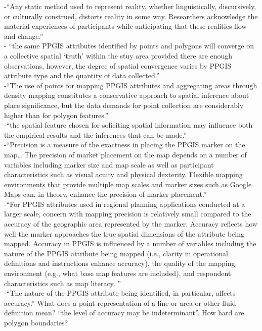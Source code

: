 -{\color{orange}“Any static method used to represent reality, whether linguistically, discursively, or culturally construed, distorts reality in some way. Researchers acknowledge the material experiences of participants while anticipating that these realities flow and change.”\cite{McQueenBaker2019}}\\
-{\color{orange} “the same PPGIS attributes identified by points and polygons will converge on a collective spatial ‘truth’ within the stuy area provided there are enough observations, however, the degree of spatial convergence varies by PPGIS attribute type and the quantity of data collected.”\cite{Brown2012}}\\
-{\color{orange}“The use of points for mapping PPGIS attributes and aggregating areas through density mapping constitutes a conservative approach to spatial inference about place significance, but the data demands for point collection are considerably higher than for polygon features.”\cite{Brown2012}}\\
-{\color{orange}“the spatial feature chosen for soliciting spatial information may influence both the empirical results and the inferences that can be made.”\cite{Brown2012}}\\
-{\color{orange}“Precision is a measure of the exactness in placing the PPGIS marker on the map… The precision of market placement on the map depends on a number of variables including marker size and map scale as well as participant characteristics such as visual acuity and physical dexterity. Flexible mapping environments that provide multiple map scales and marker sizes such as Google Maps can, in theory, enhance the precision of marker placement.” \cite{Brown2012}}\\
-{\color{orange}“For PPGIS attributes used in regional planning applications conducted at a larger scale, concern with mapping precision is relatively small compared to the accuracy of the geographic area represented by the marker. Accuracy reflects how well the marker approaches the true spatial dimensions of the attribute being mapped.  Accuracy in PPGIS is influenced by a number of variables including the nature of the PPGIS attribute being mapped (i.e., clarity in operational definitions and instructions enhance accuracy), the quality of the mapping environment (e.g., what base map features are included), and respondent characteristics such as map literacy. ”\cite{Brown2012}}\\
-{\color{orange}“The nature of the PPGIS attribute being identified, in particular, affects accuracy.” What does a point representation of a line or area or other fluid definition mean? “the level of accuracy may be indeterminant”. How hard are polygon boundaries? \cite{Brown2012}}\\
